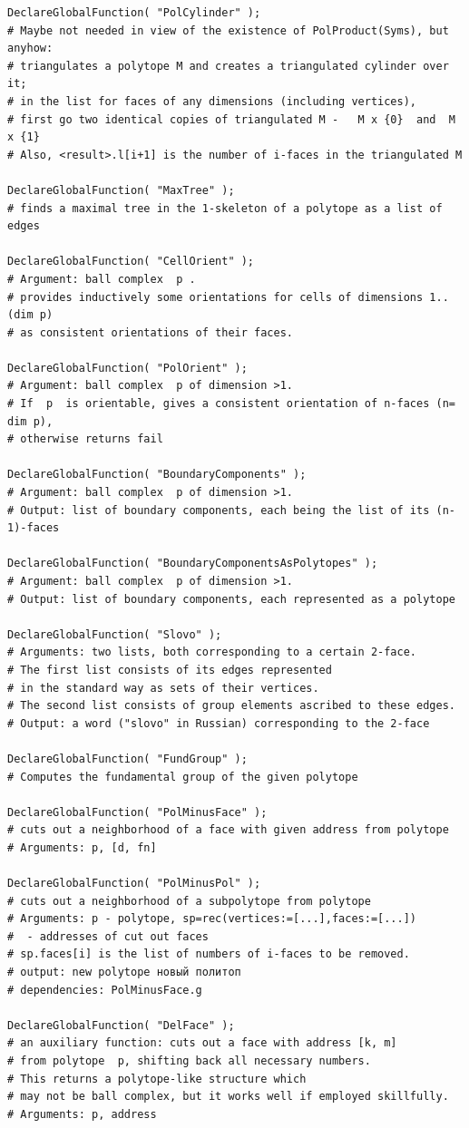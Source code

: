 \documentclass{article}
\begin{document}
\begin{verbatim}
DeclareGlobalFunction( "PolCylinder" );
# Maybe not needed in view of the existence of PolProduct(Syms), but anyhow:
# triangulates a polytope M and creates a triangulated cylinder over it;
# in the list for faces of any dimensions (including vertices),
# first go two identical copies of triangulated M -   M x {0}  and  M x {1}
# Also, <result>.l[i+1] is the number of i-faces in the triangulated M

DeclareGlobalFunction( "MaxTree" );
# finds a maximal tree in the 1-skeleton of a polytope as a list of edges

DeclareGlobalFunction( "CellOrient" );
# Argument: ball complex  p .
# provides inductively some orientations for cells of dimensions 1..(dim p) 
# as consistent orientations of their faces.

DeclareGlobalFunction( "PolOrient" );
# Argument: ball complex  p of dimension >1.
# If  p  is orientable, gives a consistent orientation of n-faces (n= dim p),
# otherwise returns fail

DeclareGlobalFunction( "BoundaryComponents" );
# Argument: ball complex  p of dimension >1.
# Output: list of boundary components, each being the list of its (n-1)-faces

DeclareGlobalFunction( "BoundaryComponentsAsPolytopes" );
# Argument: ball complex  p of dimension >1.
# Output: list of boundary components, each represented as a polytope

DeclareGlobalFunction( "Slovo" );
# Arguments: two lists, both corresponding to a certain 2-face.
# The first list consists of its edges represented 
# in the standard way as sets of their vertices.
# The second list consists of group elements ascribed to these edges.
# Output: a word ("slovo" in Russian) corresponding to the 2-face

DeclareGlobalFunction( "FundGroup" );
# Computes the fundamental group of the given polytope

DeclareGlobalFunction( "PolMinusFace" );
# cuts out a neighborhood of a face with given address from polytope
# Arguments: p, [d, fn]

DeclareGlobalFunction( "PolMinusPol" );
# cuts out a neighborhood of a subpolytope from polytope
# Arguments: p - polytope, sp=rec(vertices:=[...],faces:=[...])  
#  - addresses of cut out faces
# sp.faces[i] is the list of numbers of i-faces to be removed.
# output: new polytope новый политоп
# dependencies: PolMinusFace.g

DeclareGlobalFunction( "DelFace" );
# an auxiliary function: cuts out a face with address [k, m] 
# from polytope  p, shifting back all necessary numbers. 
# This returns a polytope-like structure which
# may not be ball complex, but it works well if employed skillfully.
# Arguments: p, address


\end{verbatim}
\end{document}
